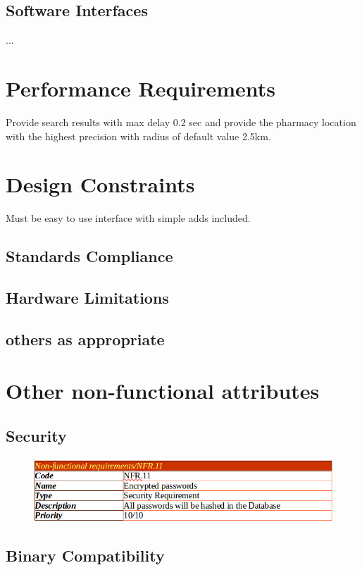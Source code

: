 \documentclass[]{article}
\begin{document}
\subsection{Software Interfaces}
... 
\section{Performance Requirements}
Provide search results with max delay 0.2 sec 
and provide the pharmacy location with the highest precision with radius of default value 2.5km.
\section{Design Constraints}
Must be easy to use interface with simple adds included.
\subsection{ Standards Compliance}
\subsection{ Hardware Limitations}
\subsection{ others as appropriate}

\section{Other non-functional attributes}

\subsection {Security}

\begin{figure}[H]
\centering
\includegraphics[scale=0.4]{./nonf/01}
\end{figure}

\subsection {Binary Compatibility}
\end{document}
